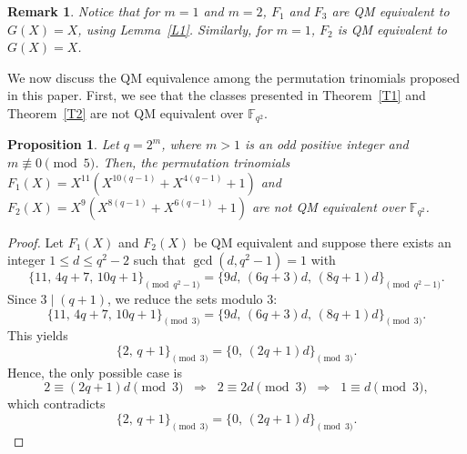 \documentclass[12pt,reqno]{amsart}
\newtheorem{prop}[thm]{Proposition}
\newtheorem{rmk}[thm]{Remark}
\numberwithin{equation}{section}
\theoremstyle{definition}
\newcommand{\F}{\mathbb F}
\begin{document}
\begin{rmk}
Notice that for $m=1$ and $m=2$, $F_1$ and $F_3$ are QM equivalent to $G(X)=X$, using Lemma~\ref{L1}. Similarly, for $m=1$, $F_2$ is QM equivalent to $G(X)=X$.
\end{rmk}

We now discuss the QM equivalence among the permutation trinomials proposed in this paper. First, we see that the classes presented in Theorem~\ref{T1} and Theorem~\ref{T2} are not QM equivalent over $\F_{q^2}$.

\begin{prop}{\label{prop2}}
Let $q=2^m$, where $m >1$ is an odd positive integer and $m \not \equiv 0 \pmod 5$. Then, the permutation trinomials $F_1(X)=X^{11}(X^{10(q-1)}+X^{4(q-1)}+1)$ and $F_2(X)=X^{9}(X^{8(q-1)}+X^{6(q-1)}+1)$ are not QM equivalent over $\F_{q^2}$.
\end{prop}
\begin{proof}
Let $F_1(X)$ and $F_2(X)$ be QM equivalent and suppose there exists an integer 
$1 \leq d \leq q^2-2$ such that $\gcd(d,q^2-1)=1$ with
\[
\{11,\, 4q+7,\, 10q+1 \}_{\pmod{q^2-1}}
= \{ 9d,\, (6q+3)d,\, (8q+1)d\}_{\pmod{q^2-1}}.
\]
Since $3 \mid (q+1)$, we reduce the sets modulo $3$:
\[
\{11,\, 4q+7,\, 10q+1 \}_{\pmod{3}}
= \{ 9d,\, (6q+3)d,\, (8q+1)d\}_{\pmod{3}}.
\]
This yields
\[
\{2,\, q + 1\}_{\pmod{3}}
= \{0,\,(2q + 1)d\}_{\pmod{3}}.
\]
Hence, the only possible case is
\[
2 \equiv (2q + 1)d \pmod{3}
\;\;\Longrightarrow\;\;
2 \equiv 2d \pmod{3}
\;\;\Longrightarrow\;\;
1 \equiv d \pmod{3},
\]
which contradicts
\[
\{2,\, q + 1\}_{\pmod{3}} = \{0,\,(2q + 1)d\}_{\pmod{3}}.
\]



	

\end{proof}
\end{document}
